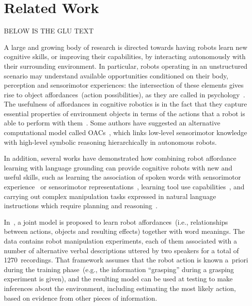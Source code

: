 
\section{Related Work}

BELOW IS THE GLU TEXT

A large and growing body of research is directed towards having robots learn new cognitive skills, or improving their capabilities, by interacting autonomously with their surrounding environment. In particular, robots operating in an unstructured scenario may understand available opportunities conditioned on their body, perception and sensorimotor experiences: the intersection of these elements gives rise to object affordances~(action possibilities), as they are called in psychology~\cite{gibson:2014}. The usefulness of affordances in cognitive robotics is in the fact that they capture essential properties of environment objects in terms of the actions that a robot is able to perform with them~\cite{montesano:2008,jamone:2016:tcds}.
Some authors have suggested an alternative computational model called \acp{OAC}~\cite{kruger:2011:ras}, which links low-level sensorimotor knowledge with high-level symbolic reasoning hierarchically in autonomous robots.

In addition, several works have demonstrated how combining robot affordance learning with language grounding can provide cognitive robots with new and useful skills, such as learning the association of spoken words with sensorimotor experience~\cite{salvi:2012:smcb,morse:2016:cogsci} or sensorimotor representations~\cite{stramandinoli:2016:icdl}, learning tool use capabilities~\cite{goncalves:2014:icarsc,goncalves:2014:icdl}, and carrying out complex manipulation tasks expressed in natural language instructions which require planning and reasoning~\cite{antunes:2016:icra}.

In~\cite{salvi:2012:smcb}, a joint model is proposed to learn robot affordances~(i.e., relationships between actions, objects and resulting effects) together with word meanings. The data contains robot manipulation experiments, each of them associated with a number of alternative verbal descriptions uttered by two speakers for a total of 1270~recordings. That framework assumes that the robot action is known a~priori during the training phase~(e.g., the information ``grasping'' during a grasping experiment is given), and the resulting model can be used at testing to make inferences about the environment, including estimating the most likely action, based on evidence from other pieces of information.

